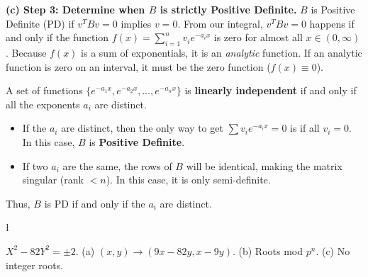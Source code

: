 \begin{solution}
\textbf{(c) Step 3: Determine when $B$ is strictly Positive Definite.}
$B$ is Positive Definite (PD) if $v^T B v = 0$ implies $v = 0$.
From our integral, $v^T B v = 0$ happens if and only if the function $f(x) = \sum_{i=1}^n v_i e^{-a_ix}$ is zero for almost all $x \in (0, \infty)$.
Because $f(x)$ is a sum of exponentials, it is an \textit{analytic} function. If an analytic function is zero on an interval, it must be the zero function ($f(x) \equiv 0$).

A set of functions $\{ e^{-a_1x}, e^{-a_2x}, \dots, e^{-a_nx} \}$ is \textbf{linearly independent} if and only if all the exponents $a_i$ are distinct.
\begin{itemize}
    \item If the $a_i$ are distinct, then the only way to get $\sum v_i e^{-a_ix} = 0$ is if all $v_i = 0$. In this case, $B$ is \textbf{Positive Definite}.
    \item If two $a_i$ are the same, the rows of $B$ will be identical, making the matrix singular (rank $< n$). In this case, it is only semi-definite.
\end{itemize}
Thus, $B$ is PD if and only if the $a_i$ are distinct.
\end{solution}

\begin{exercise}
\l\label{2014:3}

\label{algebra:2014:3}$X^2 - 82Y^2 = \pm 2$.
(a) $(x, y) \to (9x-82y, x-9y)$. (b) Roots mod $p^n$. (c) No integer roots.
\end{exercise}


